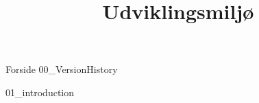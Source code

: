 \documentclass[a4paper,openany]{memoir}
\title{Udviklingsmiljø}
\begin{document}
	{Forside}  \newpage
	\tableofcontents\thispagestyle{fancy}
	{00_VersionHistory}  \newpage

	{01_introduction}  \newpage

	 {}
	\printbibliography
\end{document}
